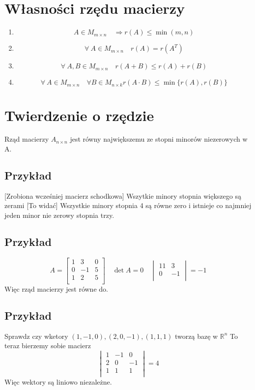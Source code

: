 \documentclass[11pt]{article}
\begin{document}
\section{Własności rzędu macierzy}
\begin{enumerate}
\item{$$ A \in M_{m \times n} \quad  \Rightarrow r(A) \leq \min{(m,n)}$$}
\item{$$ \forall\ A \in M_{m \times n} \quad r(A) = r(A^{T})$$}
\item{$$ \forall\ A,B \in M_{m \times n} \quad r(A+B) \leq r(A) + r(B)$$}
\item{$$ \forall\ A \in M_{m \times n}\quad \forall B \in M_{n \times k} r(A \cdot B) \leq \min\{r(A),r(B)\} $$}\end{enumerate}

\section{Twierdzenie o rzędzie}
Rząd macierzy $A_{n \times n}$ jest równy największemu ze stopni minorów niezerowych w A.
\subsection{Przykład}
[Zrobiona wcześniej macierz schodkowa]
Wszytkie minory stopnia większego są zerami [To widać]
Wszystkie minory stopnia 4 są równe zero i istnieje co najmniej jeden minor nie zerowy stopnia trzy.
\subsection{Przykład}
$$ A = \begin{bmatrix}
	1 & 3 & 0\\
	0 & -1 & 5\\
	1 & 2 & 5\\
\end{bmatrix} \quad \det{A} = 0 \quad \begin{vmatrix}
	11 & 3\\
	0 & -1\\
\end{vmatrix} = -1
$$
Więc rząd macierzy jest równe do.
\subsection{Przykład}
Sprawdz czy wketory $(1,-1,0),(2,0,-1),(1,1,1)$ tworzą bazę w $\mathbb{R}^n$
To teraz bierzemy sobie macierz
$$\begin{vmatrix}
	1 & -1 & 0\\
	2 & 0 & -1\\
	1 & 1 & 1\\
\end{vmatrix} = 4$$
Więc wektory są liniowo niezależne.
\end{document}
